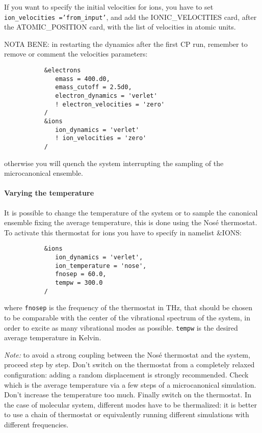\documentclass[12pt,a4paper]{article}
\begin{document}
If you want to specify the initial velocities for ions, you have to set
\texttt{ion\_velocities ='from\_input'}, and add the IONIC\_VELOCITIES
card, after the ATOMIC\_POSITION card, with the list of velocities in 
atomic units.

NOTA BENE: in restarting the dynamics after the first CP run,
remember to remove or comment the velocities parameters:
\begin{verbatim}
           &electrons
              emass = 400.d0,
              emass_cutoff = 2.5d0,
              electron_dynamics = 'verlet'
              ! electron_velocities = 'zero'
           /
           &ions
              ion_dynamics = 'verlet'
              ! ion_velocities = 'zero'
           /
\end{verbatim}
otherwise you will quench the system interrupting the sampling of the
microcanonical ensemble.

\paragraph{ Varying the temperature }
   
It is possible to change the temperature of the system or to sample the 
canonical ensemble fixing the average temperature, this is done using 
the Nos\'e thermostat. To activate this thermostat for ions you have 
to specify in namelist \&IONS:
\begin{verbatim}
           &ions
              ion_dynamics = 'verlet',
              ion_temperature = 'nose',
              fnosep = 60.0,
              tempw = 300.0
           /  
\end{verbatim}
where \texttt{fnosep} is the frequency of the thermostat in THz, that should be
chosen to be comparable with the center of the vibrational spectrum of
the system, in order to excite as many vibrational modes as possible.
\texttt{tempw} is the desired average temperature in Kelvin.
   
{\em Note:} to avoid a strong coupling between the Nos\'e thermostat 
and the system, proceed step by step. Don't switch on the thermostat 
from a completely relaxed configuration: adding a random displacement
is strongly recommended. Check which is the average temperature via a
few steps of a microcanonical simulation. Don't increase the temperature
too much. Finally switch on the thermostat. In the case of molecular system,
different modes have to be thermalized: it is better to use a chain of 
thermostat or equivalently running different simulations with different 
frequencies. 
 
\end{document}
